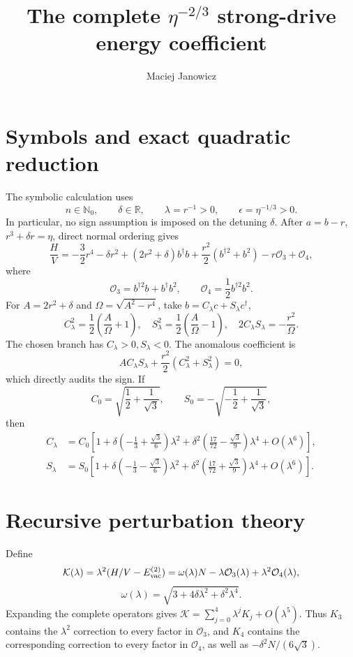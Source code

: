 \documentclass[11pt]{article}
\title{The complete \(\eta^{-2/3}\) strong-drive energy coefficient}
\author{Maciej Janowicz}
\date{}
\begin{document}
\maketitle

\section{Symbols and exact quadratic reduction}

The symbolic calculation uses
\[
n\in\mathbb N_0,\qquad \delta\in\mathbb R,\qquad
\lambda=r^{-1}>0,\qquad \epsilon=\eta^{-1/3}>0.
\]
In particular, no sign assumption is imposed on the detuning \(\delta\).
After \(a=b-r\), \(r^3+\delta r=\eta\), direct normal ordering gives
\[
\frac HV=-\frac32r^4-\delta r^2+(2r^2+\delta)b^\dagger b
+\frac{r^2}{2}(b^{\dagger2}+b^2)-r\mathcal O_3+\mathcal O_4,
\]
where
\[
\mathcal O_3=b^{\dagger2}b+b^\dagger b^2,\qquad
\mathcal O_4=\frac12b^{\dagger2}b^2.
\]
For \(A=2r^2+\delta\) and
\(\Omega=\sqrt{A^2-r^4}\), take \(b=C_\lambda c+S_\lambda c^\dagger\),
\[
C_\lambda^2=\frac12\left(\frac A\Omega+1\right),\quad
S_\lambda^2=\frac12\left(\frac A\Omega-1\right),\quad
2C_\lambda S_\lambda=-\frac{r^2}{\Omega}.
\]
The chosen branch has \(C_\lambda>0,S_\lambda<0\).  The anomalous
coefficient is
\[
AC_\lambda S_\lambda+\frac{r^2}{2}(C_\lambda^2+S_\lambda^2)=0,
\]
which directly audits the sign.  If
\[
C_0=\sqrt{\frac12+\frac1{\sqrt3}},\qquad
S_0=-\sqrt{-\frac12+\frac1{\sqrt3}},
\]
then
\begin{align*}
C_\lambda&=C_0\left[1+\delta\left(-\frac13+\frac{\sqrt3}{6}\right)
\lambda^2+\delta^2\left(\frac{17}{72}-\frac{\sqrt3}{9}\right)
\lambda^4+O(\lambda^6)\right],\\
S_\lambda&=S_0\left[1+\delta\left(-\frac13-\frac{\sqrt3}{6}\right)
\lambda^2+\delta^2\left(\frac{17}{72}+\frac{\sqrt3}{9}\right)
\lambda^4+O(\lambda^6)\right].
\end{align*}

\section{Recursive perturbation theory}

Define
\[
\mathcal K(\lambda)=\lambda^2(H/V-E_{\rm vac}^{(2)})
=\omega(\lambda)N-\lambda\mathcal O_3(\lambda)
+\lambda^2\mathcal O_4(\lambda),
\]
\[
\omega(\lambda)=\sqrt{3+4\delta\lambda^2+\delta^2\lambda^4}.
\]
Expanding the complete operators gives
\(\mathcal K=\sum_{j=0}^4\lambda^jK_j+O(\lambda^5)\).  Thus \(K_3\)
contains the \(\lambda^2\) correction to every factor in \(\mathcal O_3\),
and \(K_4\) contains the corresponding correction to every factor in
\(\mathcal O_4\), as well as
\(-\delta^2N/(6\sqrt3)\).
\end{document}

